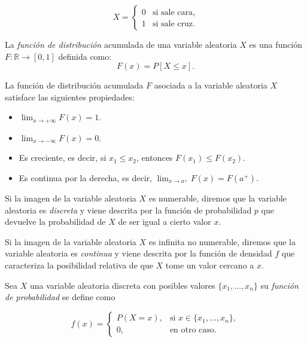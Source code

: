 $$X=
\begin{cases}
0 & \text{si sale cara}, \\
1 & \text{si sale cruz}.
\end{cases}
$$

\begin{definition}
La \textit{función de distribución} acumulada de una variable aleatoria $X$ es una función $F: \mathbb{R} \to [0,1]$ definida como: $$F(x)=P[X\leq x].$$
\end{definition}

\begin{proposition} La función de distribución acumulada $F$ asociada a la variable aleatoria $X$ satisface las siguientes propiedades:

\begin{itemize}
    \item $\displaystyle \lim_{x\to +\infty} F(x)=1$.
    \item $\displaystyle \lim_{x\to -\infty} F(x)=0$.
    \item Es creciente, es decir, si $x_1 \leq x_2$, entonces $F(x_1) \leq F(x_2)$.
    \item Es continua por la derecha, es decir, $\displaystyle \lim_{x\to a^+} F(x)=F(a^+)$.
\end{itemize}
\end{proposition}

Si la imagen de la variable aleatoria $X$ es numerable, diremos que la variable aleatoria es \textit{discreta} y viene descrita por la función de probabilidad $p$ que devuelve la probabilidad de $X$ de ser igual a cierto valor $x$. 

Si la imagen de la variable aleatoria $X$ es infinita no numerable, diremos que la variable aleatoria es \textit{continua} y viene descrita por la función de densidad $f$ que caracteriza la posibilidad relativa de que $X$ tome un valor cercano a $x$.

\begin{definition}
Sea $X$ una variable aleatoria discreta con posibles valores $\{x_1,\dots,x_n\}$ su \textit{función de probabilidad} se define como 

$$f(x)= 
\begin{cases}
P(X=x), & \text{si } x\in \{x_1,\dots,x_n\}, \\
0, & \text{en otro caso}.
\end{cases}
$$
\end{definition}

